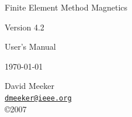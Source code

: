 \documentclass[12pt]{report}
\begin{document}
\thispagestyle{empty}

\vspace*{2.5in}

\vspace*{0.5in}
\begin{center}
{\LARGE Finite Element Method Magnetics}

\vspace*{16pt} {\Large Version 4.2}

\vspace*{16pt} {\Large User's Manual}

\vspace*{16pt} \today

\vspace*{48pt} David Meeker \\
\href{mailto:dmeeker@ieee.org}{\tt dmeeker@ieee.org} \\
\copyright 2007
\end{center}

\newpage
\end{document}
